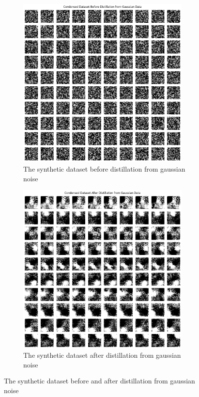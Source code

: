 \documentclass[onecolumn]{IEEEtran}
\begin{document}
\begin{figure}[H]
    \centering
    \begin{subfigure}{.5\textwidth}
        \centering
        \includegraphics[width=0.95\textwidth]{images/MNIST_pad_before_distil_gaussian.png}
        \caption{The synthetic dataset before distillation from gaussian noise}
        \label{fig:MNIST_pad_before_distil_gaussian}
    \end{subfigure}%
    \begin{subfigure}{.5\textwidth}
        \centering
        \includegraphics[width=0.95\textwidth]{images/MNIST_pad_after_distil_gaussian.png}
        \caption{The synthetic dataset after distillation from gaussian noise}
        \label{fig:MNIST_pad_after_distil_gaussian}
    \end{subfigure}
    \caption{The synthetic dataset before and after distillation from gaussian noise}
\end{figure}
\end{document}
